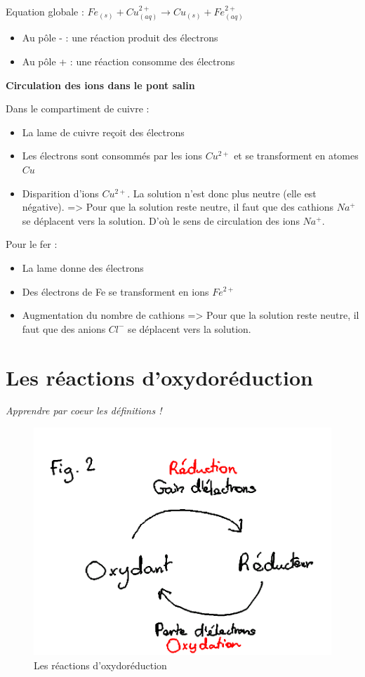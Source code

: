 \documentclass[12pt]{article}
\begin{document}
Equation globale : $Fe_{(s)} + Cu^{2+}_{(aq)} \rightarrow Cu_{(s)} + Fe^{2+}_{(aq)}$

\begin{itemize}
\item Au pôle - : une réaction produit des électrons
\item Au pôle + : une réaction consomme des électrons
\end{itemize}

\textbf{Circulation des ions dans le pont salin}

Dans le compartiment de cuivre :
\begin{itemize}
\item La lame de cuivre reçoit des électrons
\item Les électrons sont consommés par les ions $Cu^{2+}$ et se transforment en atomes $Cu$
\item Disparition d'ions $Cu^{2+}$. La solution n'est donc plus neutre (elle est négative).
=> Pour que la solution reste neutre, il faut que des cathions $Na^+$ se déplacent vers la solution. D'où le sens de circulation des ions $Na^+$.
\end{itemize}

Pour le fer :
\begin{itemize}
\item La lame donne des électrons
\item Des électrons de Fe se transforment en ions $Fe^{2+}$
\item Augmentation du nombre de cathions
=> Pour que la solution reste neutre, il faut que des anions $Cl^-$ se déplacent vers la solution.
\end{itemize}

\section{Les réactions d'oxydoréduction}

\emph{Apprendre par coeur les définitions !}

\begin{figure}[htp]
\centering
\includegraphics[scale=1.00]{img/tp19_fig2.png}
\caption{Les réactions d'oxydoréduction}
\label{}
\end{figure}
\end{document}
